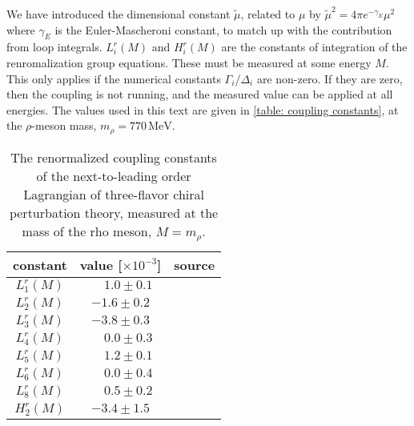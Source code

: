 %
We have introduced the dimensional constant $\tilde \mu$, related to $\mu$ by $\tilde \mu^2 = 4 \pi e^{-\gamma_E} \mu^2$ where $\gamma_E$ is the Euler-Mascheroni constant, to match up with the contribution from loop integrals.
$L_i^r(M)$ and $H_i^r(M)$ are the constants of integration of the renromalization group equations.
These must be measured at some energy $M$.
This only applies if the numerical constants $\Gamma_i$/$\Delta_i$ are non-zero.
If they are zero, then the coupling is not running, and the measured value can be applied at all energies.
The values used in this text are given in \autoref{table: coupling constants}, at the $\rho$-meson mass, $m_\rho = 770\, \text{MeV}$.
%
\begin{table}
    \centering
    \def\arraystretch{1.2}
    \caption{The renormalized coupling constants of the next-to-leading order Lagrangian of three-flavor chiral perturbation theory, measured at the mass of the rho meson, $M = m_\rho$.}
    \label{table: coupling constants}
    \begin{tabular}{c c c}
        \hline \hline
        constant & value [$\times 10^{-3}$] & source \\
        \hline
        $L_1^r(M)$ & $\phantom{-}1.0 \pm 0.1 $ & \autocite{bijnensMesonicLowEnergyConstants2014} \\
        $L_2^r(M)$ & $-1.6 \pm 0.2 $ & \autocite{bijnensMesonicLowEnergyConstants2014} \\
        $L_3^r(M)$ & $-3.8 \pm 0.3 $ & \autocite{bijnensMesonicLowEnergyConstants2014} \\
        $L_4^r(M)$ & $\phantom{-}0.0 \pm 0.3 $ & \autocite{bijnensMesonicLowEnergyConstants2014} \\
        $L_5^r(M)$ & $\phantom{-}1.2 \pm 0.1 $ & \autocite{bijnensMesonicLowEnergyConstants2014} \\
        $L_6^r(M)$ & $\phantom{-}0.0 \pm 0.4 $ & \autocite{bijnensMesonicLowEnergyConstants2014} \\
        $L_8^r(M)$ & $\phantom{-}0.5 \pm 0.2 $ & \autocite{bijnensMesonicLowEnergyConstants2014} \\
        $H_2^r(M)$ & $-3.4 \pm 1.5 $ & \autocite{jaminFlavoursymmetryBreakingQuark2002}  \\
        \hline
    \end{tabular}
\end{table}

